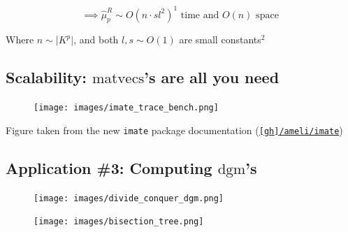 \documentclass[
  letterpaper,
  DIV=11,
  numbers=noendperiod,
  oneside]{scrartcl}
\begin{document}
\[\implies \hat{\mu}_p^{R} \sim O(n \cdot s l^2)^{1} \text{ time and } O(n) \text{ space }\]

Where \(n \sim \lvert K^p \rvert\), and both \(l, s \sim O(1)\) are
small constants\(^2\)


\subsection{\texorpdfstring{Scalability: \(\mathrm{matvecs}\)'s are all
you
need}{Scalability: \textbackslash mathrm\{matvecs\}'s are all you need}}\label{scalability-mathrmmatvecss-are-all-you-need}

\begin{figure}

{\centering \texttt{[image: images/imate\_trace\_bench.png]}

}

\end{figure}

Figure taken from the new \texttt{imate} package documentation
(\href{https://ameli.github.io/imate/index.html}{\texttt{{[}gh{]}/ameli/imate}})

\subsection{\texorpdfstring{Application \#3: Computing
\(\mathrm{dgm}\)'s}{Application \#3: Computing \textbackslash mathrm\{dgm\}'s}}\label{application-3-computing-mathrmdgms}

\begin{figure}

\begin{minipage}[b]{0.50\linewidth}

{\centering 

\texttt{[image: images/divide\_conquer\_dgm.png]}

}

\end{minipage}%
%
\begin{minipage}[b]{0.50\linewidth}

{\centering 

\texttt{[image: images/bisection\_tree.png]}

}

\end{minipage}%

\end{figure}
\end{document}
